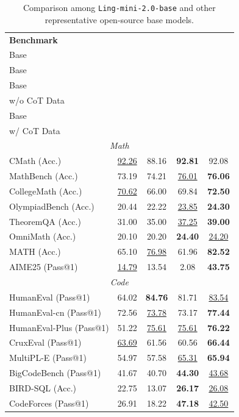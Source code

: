 \begin{table}[h]
\centering
\caption{{Comparison among \texttt{Ling-mini-2.0-base} and other representative open-source base models. }}
\label{tab:mini-base-benchmarks}
\small
{
\begin{tabular}{lcccc}
\toprule
\textbf{Benchmark} & \textbf{\splitcell{Hunyuan-7B \\ Base}}  & 
\textbf{\splitcell{Qwen3-8B \\ Base}}  & \textbf{\splitcell{\texttt{Ling-mini-2.0} \\ Base \\ w/o CoT Data}} & \textbf{\splitcell{\texttt{Ling-mini-2.0} \\ Base \\ w/ CoT Data}} \\
\midrule
\multicolumn{5}{c}{\textit{Math}} \\
\midrule
CMath (Acc.) & \underline{92.26} & 88.16 & \textbf{92.81} & 92.08\\
MathBench (Acc.) & 73.19 & 74.21 & \underline{76.01} & \textbf{76.06} \\
CollegeMath (Acc.) & \underline{70.62} & 66.00 & 69.84 & \textbf{72.50}\\
OlympiadBench (Acc.) & 20.44 & 22.22 & \underline{23.85} & \textbf{24.30}\\
TheoremQA (Acc.) & 31.00 & 35.00 & \underline{37.25} & \textbf{39.00}\\
OmniMath (Acc.) & 20.10 & 20.20 & \textbf{24.40} & \underline{24.20}\\
MATH (Acc.) & 65.10 & \underline{76.98} & 61.96 & \textbf{82.52}\\
AIME25 (Pass@1) & \underline{14.79} & 13.54 & 2.08 & \textbf{43.75} \\
\midrule
\multicolumn{5}{c}{\textit{Code}} \\
\midrule
HumanEval (Pass@1) & 64.02 & \textbf{84.76} & 81.71 & \underline{83.54} \\
HumanEval-cn (Pass@1) & 72.56 & \underline{73.78} & 73.17 & \textbf{77.44} \\
HumanEval-Plus (Pass@1) & 51.22 & \underline{75.61} & \underline{75.61} & \textbf{76.22}\\
CruxEval (Pass@1) & \underline{63.69} & 61.56 & 60.56 & \textbf{66.44} \\
MultiPL-E (Pass@1) & 54.97 & 57.58 & \underline{65.31} & \textbf{65.94}\\

BigCodeBench (Pass@1) & 41.67 & 40.70 & \textbf{44.30} & \underline{43.68} \\
BIRD-SQL (Acc.) & 22.75 & 13.07 & \textbf{26.17} & \underline{26.08} \\
CodeForces (Pass@1) & 26.91 & 18.22 & \textbf{47.18} & \underline{42.50} \\


\end{tabular}}
\end{table}
